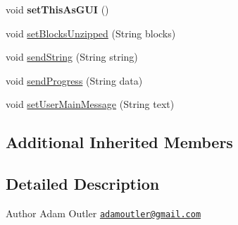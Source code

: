 \begin{DoxyCompactItemize}
\item 
\hypertarget{class_g_u_i_1_1_command_line_1_1_command_line_u_i_aa017698f930a40bedeffb51797496dc8}{void {\bfseries set\-This\-As\-G\-U\-I} ()}\label{class_g_u_i_1_1_command_line_1_1_command_line_u_i_aa017698f930a40bedeffb51797496dc8}

\item 
void \hyperlink{class_g_u_i_1_1_command_line_1_1_command_line_u_i_a022a1424d56e1022bc51548f39a65cdf}{set\-Blocks\-Unzipped} (String blocks)
\item 
void \hyperlink{class_g_u_i_1_1_command_line_1_1_command_line_u_i_a89eed0c4a9870d55d0378b5ab67a2496}{send\-String} (String string)
\item 
void \hyperlink{class_g_u_i_1_1_command_line_1_1_command_line_u_i_a1d67f6028e90f0439c633ca18382aefe}{send\-Progress} (String data)
\item 
void \hyperlink{class_g_u_i_1_1_command_line_1_1_command_line_u_i_a6437b5a62a4805cc6e1d9651cc5db5ef}{set\-User\-Main\-Message} (String text)
\end{DoxyCompactItemize}
\subsection*{Additional Inherited Members}


\subsection{Detailed Description}
\begin{DoxyAuthor}{Author}
Adam Outler \href{mailto:adamoutler@gmail.com}{\tt adamoutler@gmail.\-com} 
\end{DoxyAuthor}


